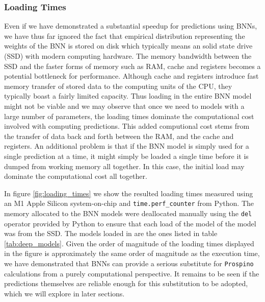 \subsubsection{Loading Times}
Even if we have demonstrated a substantial speedup for predictions using BNNs, we have thus far ignored the fact that empirical distribution representing the weights of the BNN is stored on disk which typically means an solid state drive (SSD) with modern computing hardware. The memory bandwidth between the SSD and the faster forms of memory such as RAM, cache and registers becomes a potential bottleneck for performance. Although cache and registers introduce fast memory transfer of stored data to the computing units of the CPU, they typically boast a fairly limited capacity. Thus loading in the entire BNN model might not be viable and we may observe that once we need to models with a large number of parameters, the loading times dominate the computational cost involved with computing predictions. This added computional cost stems from the transfer of data back and forth between the RAM, and the cache and registers. An additional problem is that if the BNN model is simply used for a single prediction at a time, it might simply be loaded a single time before it is dumped from working memory all together. In this case, the initial load may dominate the computational cost all together. 

In figure \ref{fig:loading_times} we show the resulted loading times measured using an M1 Apple Silicon system-on-chip and {\tt time.perf\_counter} from Python. The memory allocated to the BNN models were deallocated manually using the {\tt del} operator provided by Python to ensure that each load of the model of the model was from the SSD. The models loaded in are the ones listed in table \ref{tab:deep_models}. Given the order of magnitude of the loading times displayed in the figure is approximately the same order of magnitude as the execution time, we have demonstrated that BNNs can provide a serious substitute for {\tt Prospino} calculations from a purely computational perspective. It remains to be seen if the predictions themselves are reliable enough for this substitution to be adopted, which we will explore in later sections.

